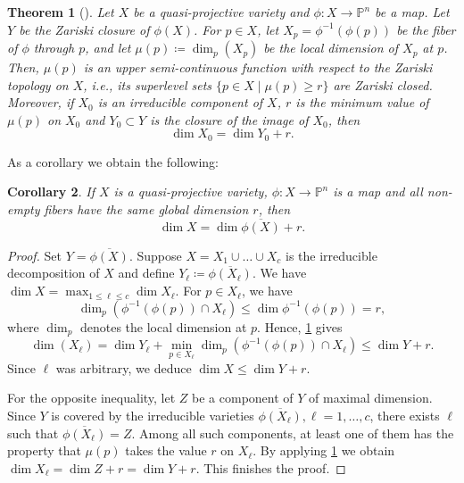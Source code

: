 \documentclass[11pt,a4paper]{article}
\newtheorem{theorem}{Theorem}[section]
\newtheorem{corollary}[theorem]{Corollary}\AddToHook{env/corollary/begin}{\crefalias{theorem}{corollary}}
\numberwithin{equation}{section}
\newcommand{\PP}{\mathbb{P}}
\begin{document}
\begin{theorem}[{\cite[Theorem~11.12]{Harris-93}}]
\label{thm:harris-dim}
    Let $X$ be a quasi-projective variety and $\phi:X\rightarrow\PP^n$ be a map.
    Let $Y$ be the Zariski closure of $\phi(X)$.
    For $p\in X$, let $X_p=\phi^{-1}(\phi(p))$ be the fiber of $\phi$ through $p$, and let $\mu(p)\coloneqq \dim_p(X_p)$ be the local dimension of $X_p$ at $p$.
    Then, $\mu(p)$ is an upper semi-continuous function with respect to the Zariski topology on $X$, i.e., its superlevel sets $\{p\in X\mid \mu(p)\geq r\}$ are Zariski closed.
    Moreover, if $X_0$ is an irreducible component of $X$, $r$ is the minimum value of $\mu(p)$ on $X_0$ and $Y_0\subset Y$ is the closure of the image of $X_0$, then \[
    \dim X_0 = \dim Y_0 + r.
    \]
\end{theorem}

As a corollary we obtain the following:
\begin{corollary}
\label{cor:quasi-proj-dim}
   If $X$ is a quasi-projective variety, $\phi:X\rightarrow\PP^{n}$ is a map and all non-empty fibers have the same global dimension $r$, then \[
   \dim X = \dim\overline{\phi(X)} + r.
   \]
\end{corollary}
\begin{proof}
Set $Y=\overline{\phi(X)}$.
    Suppose $X=X_1\cup \dots\cup X_c$ is the irreducible decomposition of $X$ and define $Y_\ell\coloneqq\overline{\phi(X_\ell)}$.
    We have $\dim X =\max_{1\leq \ell\leq c}\dim X_\ell $.
    For $p\in X_{\ell}$, we have \[
    \dim_p(\phi^{-1}(\phi(p))\cap X_{\ell}) \leq \dim\phi^{-1}(\phi(p)) = r,
    \] where $\dim_p$ denotes the local dimension at $p$.
    Hence, \cref{thm:harris-dim} gives \[
    \dim(X_{\ell}) = \dim Y_\ell + \min_{p\in X_{\ell}}\dim_p\left(\phi^{-1}(\phi(p))\cap X_{\ell}\right) \leq \dim Y+r.
    \] Since $\ell$ was arbitrary, we deduce $\dim X\leq \dim Y +r$.
    
    For the opposite inequality, let $Z$ be a component of $Y$ of maximal dimension.
    Since $Y$ is covered by the irreducible varieties $\overline{\phi(X_\ell)}, \ell=1,\dots,c$, there exists $\ell$ such that $\overline{\phi(X_\ell)}=Z$.
Among all such components, at least one of them has the property that $\mu(p)$ takes the value $r$ on $X_\ell$.     
By applying \cref{thm:harris-dim} we obtain $\dim X_{\ell}=\dim Z + r=\dim Y+r$.
    This finishes the proof.
\end{proof}
\end{document}

